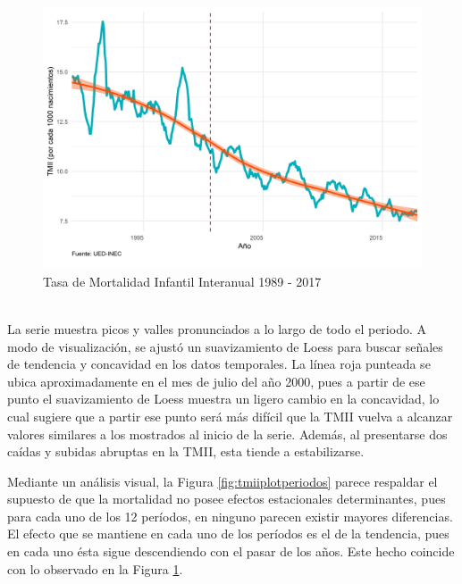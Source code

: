 \documentclass[
]{article}
\begin{document}
\begin{figure}[H]
\includegraphics[width=1\linewidth,height=1\textheight]{Tesis_files/figure-latex/tmiiplotgeneral-1} \caption{Tasa de Mortalidad Infantil Interanual 1989 - 2017  \textcolor{white}{prueba de aaaaaaaaaaaaaaaaaaaaaaa}}\label{fig:tmiiplotgeneral}
\end{figure}

La serie muestra picos y valles pronunciados a lo largo de todo el
periodo. A modo de visualización, se ajustó un suavizamiento de Loess
para buscar señales de tendencia y concavidad en los datos temporales.
La línea roja punteada se ubica aproximadamente en el mes de julio del
año 2000, pues a partir de ese punto el suavizamiento de Loess muestra
un ligero cambio en la concavidad, lo cual sugiere que a partir ese
punto será más difícil que la TMII vuelva a alcanzar valores similares a
los mostrados al inicio de la serie. Además, al presentarse dos caídas y
subidas abruptas en la TMII, esta tiende a estabilizarse.

Mediante un análisis visual, la Figura \ref{fig:tmiiplotperiodos} parece
respaldar el supuesto de que la mortalidad no posee efectos estacionales
determinantes, pues para cada uno de los 12 períodos, en ninguno parecen
existir mayores diferencias. El efecto que se mantiene en cada uno de
los períodos es el de la tendencia, pues en cada uno ésta sigue
descendiendo con el pasar de los años. Este hecho coincide con lo
observado en la Figura \ref{fig:tmiiplotgeneral}.
\end{document}
